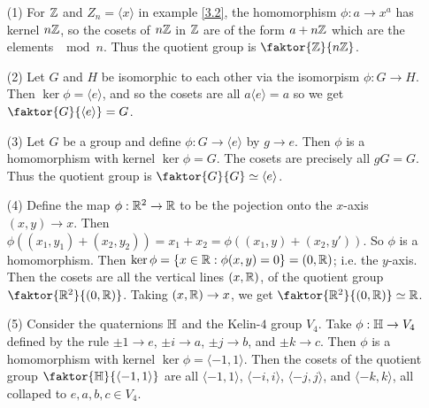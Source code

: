 \begin{example}\label{example_3.2}
  \begin{enumerate}
    \item[(1)] For $\mathbb{Z}$ and  $Z_n=\langle x \rangle$ in example \ref {3.2}, the
      homomorphism $\phi:a \rightarrow x^a$ has kernel $n\mathbb{Z}$, so the
      cosets of  $n\mathbb{Z}$ in  $\mathbb{Z}$ are of the form  $a+n\mathbb{Z}$ which are the
      elements $\mod{n}$. Thus the quotient group is $\faktor{\Z}{n\Z}$.

    \item[(2)] Let $G$ and  $H$ be isomorphic to each other via the
      isomorpism  $\phi:G \rightarrow H$. Then $\ker{\phi}=\langle e
      \rangle$, and so the cosets are all $a\langle e \rangle=a$ so we get
      $\faktor{G}{\langle e \rangle}=G$.

    \item[(3)] Let $G$ be a group and define  $\phi:G \rightarrow
      \langle e \rangle$ by $g \rightarrow e$. Then $\phi$ is a homomorphism
      with kernel $\ker{\phi}=G$. The cosets are precisely all $gG=G$. Thus
      the quotient group is $\faktor{G}{G} \simeq \langle e \rangle$.

    \item[(4)] Define the map $\phi:\mathbb{R}^2 \rightarrow \mathbb{R}$ to be the
      pojection onto the $x$-axis $(x,y) \rightarrow x$. Then
      $\phi((x_1,y_1)+(x_2,y_2))=x_1+x_2=\phi((x_1,y)+(x_2,y'))$. So
      $\phi$ is a homomorphism. Then $\ker{\phi}=\{x \in \mathbb{R} :
      \phi(x,y)=0\}=(0,\mathbb{R})$; i.e. the $y$-axis. Then the cosets are all
      the vertical lines $(x,\mathbb{R})$, of the quotient group
      $\faktor{\R^2}{(0,\R)}$. Taking $(x,\mathbb{R}) \rightarrow x$, we get
      $\faktor{\R^2}{(0,\R)} \simeq \R$.

    \item[(5)] Consider the quaternions $\mathbb{H}$ and the Kelin-$4$ group  $V_4$.
      Take  $\phi:\mathbb{H} \rightarrow V_4$ defined by the rule $\pm 1
      \rightarrow e$, $\pm i \rightarrow a$, $\pm j \rightarrow b$, and
      $\pm k \rightarrow c$. Then  $\phi$ is a homomorphism with kernel
      $\ker{\phi}=\langle -1 ,1 \rangle$. Then the cosets of the quotient group
      $\faktor{\Hb}{\langle -1, 1 \rangle}$ are all $\langle -1 ,1 \rangle$,
      $\langle -i, i \rangle$, $\langle -j, j \rangle$, and  $\langle
      -k, k \rangle$, all
      collaped to  $e,a,b,c \in V_4$.
  \end{enumerate}
\end{example}
